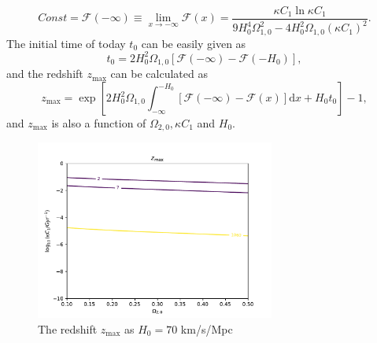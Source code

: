 \documentclass[twocolumn]{aastex631}
\begin{document}
   \begin{equation}
      Const=\mathcal{F}(-\infty)\equiv\lim_{x\to-\infty}\mathcal{F}(x)=
      \frac{\kappa C_1\ln\kappa C_1}{9H_0^4\Omega_{1,0}^2-4H_0^2\Omega_{1,0}(\kappa C_1)^2}.
   \end{equation}
   The initial time of today $t_0$ can be easily given as
   \begin{equation}
      t_0=2H_0^2\Omega_{1,0}[\mathcal{F}(-\infty)-\mathcal{F}(-H_0)],
   \end{equation}
   and the redshift $z_{\max}$ can be calculated as
   \begin{equation}
      z_{\max}=\exp\left[2H_0^2\Omega_{1,0}\int_{-\infty}^{-H_0}[\mathcal{F}(-\infty)
      -\mathcal{F}(x)]\mathrm{d}x+H_0t_0\right]-1,
   \end{equation}
   and $z_{\max}$ is also a function of $\Omega_{2,0}, \kappa C_1$ and $H_0$.
   \begin{figure}[htbp]
      \centering
      \includegraphics[width=0.7\textwidth]{zmax.pdf}
      \caption{The redshift $z_{\max}$ as $H_0=70$ km/s/Mpc}
   \end{figure}



\end{document}
